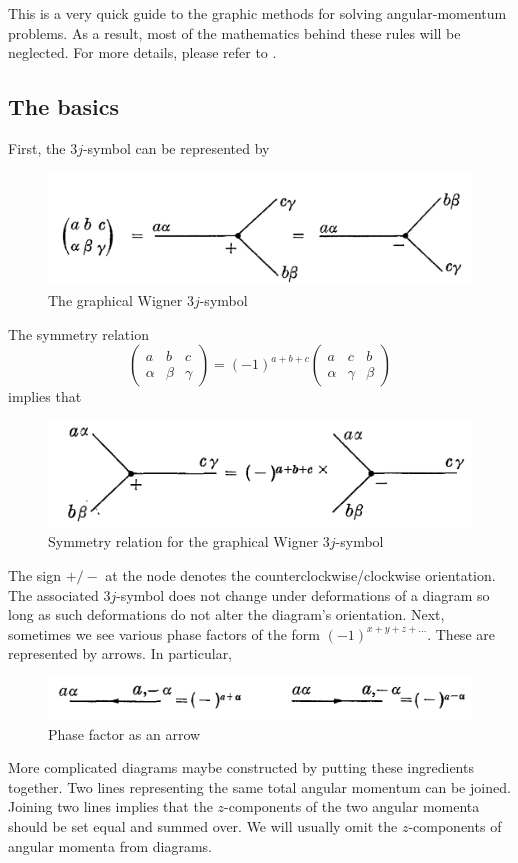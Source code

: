 \documentclass[11pt]{article}
\newcommand{\al}{\alpha}
\newcommand{\be}{\beta}
\newcommand{\tj}[6]{ \begin{pmatrix}
		#1 & #2 & #3 \\
		#4 & #5 & #6 
\end{pmatrix}}
\begin{document}
\begin{appendices}
This is a very quick guide to the graphic methods for solving angular-momentum problems. As a result, most of the mathematics behind these rules will be neglected. For more details, please refer to \cite{angular_momentum}.

\subsection{The basics}
First, the $3j$-symbol can be represented by 
\begin{figure}[!htb]
	\centering
	\includegraphics[scale=0.7]{j3_graph}
	\caption{The graphical Wigner $3j$-symbol \cite{angular_momentum}}
\end{figure}
The symmetry relation 
\begin{equation*}
\tj{a}{b}{c}{\al}{\be}{\gamma} = (-1)^{a+b+c}\tj{a}{c}{b}{\al}{\gamma}{\be}
\end{equation*}
implies that 
\begin{figure}[!htb]
	\centering
	\includegraphics[scale=0.7]{j3_graph1}
	\caption{Symmetry relation for the graphical Wigner $3j$-symbol \cite{angular_momentum}}
\end{figure}
The sign $+/-$ at the node denotes the counterclockwise/clockwise orientation. The associated $3j$-symbol does not change under deformations of a diagram so long as such deformations do not alter the diagram's orientation. Next, sometimes we see various phase factors of the form $(-1)^{x+y+z+\dots}$. These are represented by arrows. In particular, 
\begin{figure}[!htb]
	\centering
	\includegraphics[scale=0.7]{j3_graph2}
	\caption{Phase factor as an arrow \cite{angular_momentum}}
\end{figure}
More complicated diagrams maybe constructed by putting these ingredients together. Two lines representing the same total angular momentum can be joined. Joining two lines implies that the $z$-components of the two angular momenta should be set equal and summed over. We will usually omit the $z$-components of angular momenta from diagrams. 


\end{appendices}
\end{document}
